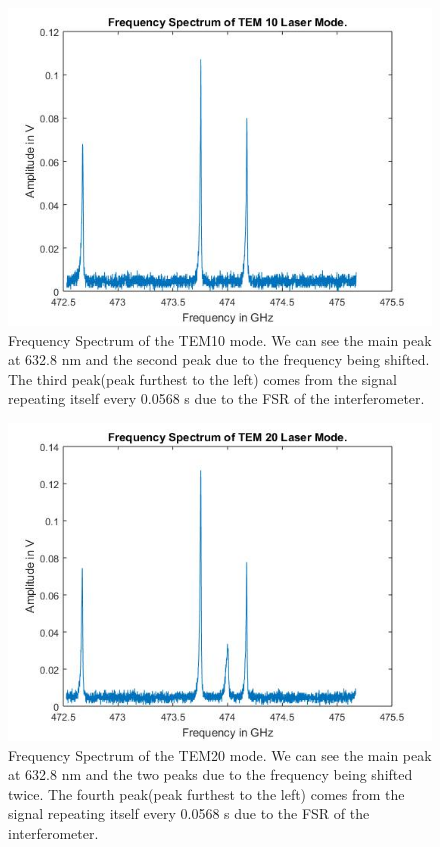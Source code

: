 \documentclass{article}
\begin{document}
\begin{figure}[H]
\includegraphics[scale=0.4,center]{TEM10.jpg}
\caption{Frequency Spectrum of the TEM10 mode.  We can see the main peak at 632.8 nm and the second peak due to the frequency being shifted.  The third peak(peak furthest to the left) comes from the signal repeating itself every 0.0568 s due to the FSR of the interferometer.}
\end{figure}

\begin{figure}[H]
\includegraphics[scale=0.4,center]{TEM20.jpg}
\caption{Frequency Spectrum of the TEM20 mode.  We can see the main peak at 632.8 nm and the two peaks due to the frequency being shifted twice.  The fourth peak(peak furthest to the left) comes from the signal repeating itself every 0.0568 s due to the FSR of the interferometer.}
\end{figure}
\end{document}
